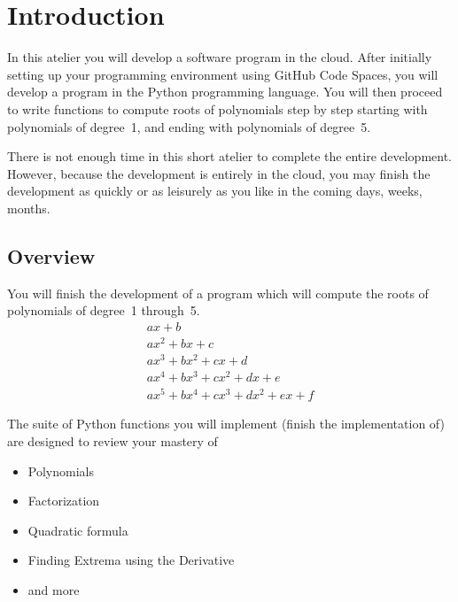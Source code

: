 \section{Introduction}
\label{sec.intro}

In this atelier you will develop a software program in the cloud.  After
initially setting up your programming environment using GitHub Code Spaces, you
will develop a  program in the
Python programming language.  You will then proceed to write functions
to compute roots of polynomials step by step starting with polynomials
of degree~1, and ending with polynomials of degree~5.

There is not enough time in this short atelier to complete the entire
development.  However, because the development is entirely in the
cloud, you may finish the development as quickly or as leisurely as
you like in the coming days, weeks, months.

\subsection{Overview}

You will finish the development of a program which will compute the
roots of polynomials of degree~1 through~5.
\begin{align*}
  a x + b\\
  a x^2 + b x + c\\
  a x^3 + b x^2 + c x + d\\
  a x^4 + b x^3 + c x^2 + d x + e\\
  a x^5 + b x^4 + c x^3 + d x^2 + e x + f
\end{align*}

The suite of Python functions you will implement (finish the
implementation of) are designed to review your mastery of
\begin{itemize}
\item Polynomials
\item Factorization
\item Quadratic formula
\item Finding Extrema using the Derivative
\item and more
\end{itemize}

